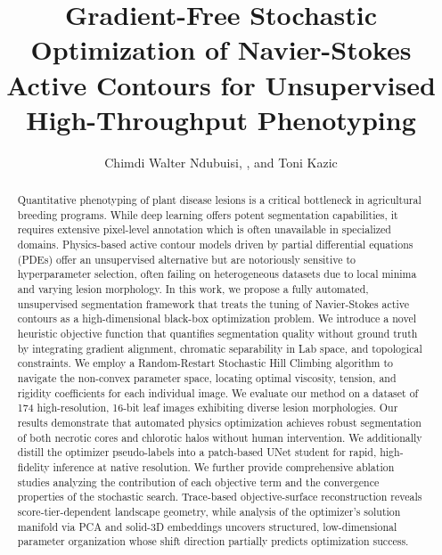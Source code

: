 \documentclass[journal]{IEEEtran}
\begin{document}
\title{Gradient-Free Stochastic Optimization of Navier-Stokes Active Contours for Unsupervised High-Throughput Phenotyping}

\author{Chimdi Walter Ndubuisi, , and Toni Kazic}

\maketitle

\begin{abstract}
Quantitative phenotyping of plant disease lesions is a critical bottleneck in agricultural breeding programs. While deep learning offers potent segmentation capabilities, it requires extensive pixel-level annotation which is often unavailable in specialized domains. Physics-based active contour models driven by partial differential equations (PDEs) offer an unsupervised alternative but are notoriously sensitive to hyperparameter selection, often failing on heterogeneous datasets due to local minima and varying lesion morphology. In this work, we propose a fully automated, unsupervised segmentation framework that treats the tuning of Navier-Stokes active contours as a high-dimensional black-box optimization problem. We introduce a novel heuristic objective function that quantifies segmentation quality without ground truth by integrating gradient alignment, chromatic separability in Lab space, and topological constraints. We employ a Random-Restart Stochastic Hill Climbing algorithm to navigate the non-convex parameter space, locating optimal viscosity, tension, and rigidity coefficients for each individual image. We evaluate our method on a dataset of 174 high-resolution, 16-bit leaf images exhibiting diverse lesion morphologies. Our results demonstrate that automated physics optimization achieves robust segmentation of both necrotic cores and chlorotic halos without human intervention. We additionally distill the optimizer pseudo-labels into a patch-based UNet student for rapid, high-fidelity inference at native resolution. We further provide comprehensive ablation studies analyzing the contribution of each objective term and the convergence properties of the stochastic search. Trace-based objective-surface reconstruction reveals score-tier-dependent landscape geometry, while analysis of the optimizer's solution manifold via PCA and solid-3D embeddings uncovers structured, low-dimensional parameter organization whose shift direction partially predicts optimization success.
\end{abstract}
\end{document}
